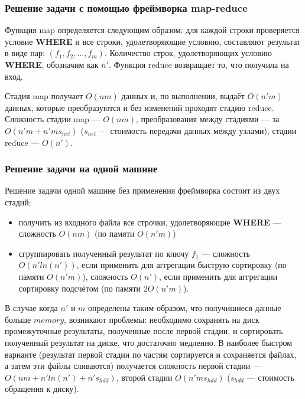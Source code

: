 \documentclass[12pt,a4paper,oneside]{extarticle}
\begin{document}
        \subsubsection{Решение задачи с помощью фреймворка map-reduce}
            
            Функция map определяется следующим образом: для каждой строки проверяется условие {\bf WHERE} и все строки, удолетворяющие условию, составляют результат в виде пар: $(f_1, f_2, ..., f_m)$. Количество строк, удолетворяющих условию {\bf WHERE}, обозначим как $n'$. Функция reduce возвращает то, что получила на вход.

            Стадия map получает $O(nm)$ данных и, по выполнении, выдаёт $O(n'm)$ данных, которые преобразуются и без изменений проходят стадию reduce. Сложность стадии map --- $O(nm)$, преобразования между стадиями --- за $O(n'm+n'ms_{net})$ ($s_{net}$ --- стоимость передачи данных между узлами), стадии reduce --- $O(n')$. 

        \subsubsection{Решение задачи на одной машине}
            Решение задачи одной машине без применения фреймворка состоит из двух стадий: 
            \begin{itemize}
                \item получить из входного файла все строчки, удолетворяющие {\bf WHERE} --- сложность $O(nm)$ (по памяти $O(n'm)$)
                \item сгруппировать полученный результат по ключу $f_1$ --- сложность $O(n'ln(n'))$, если применить для аггрегации быструю сортировку (по памяти $O(n'm)$), сложность $O(n')$, если применить для аггрегации сортировку подсчётом (по памяти $2O(n'm)$).
            \end{itemize}

            В случае когда $n'$ и $m$ определены таким образом, что получишиеся данные больше $memory$, возникают проблемы: необходимо сохранять на диск промежуточные результаты, полученные после первой стадии, и сортировать полученный результат на диске, что достаточно медленно. В наиболее быстром варианте (результат первой стадии по частям сортируется и сохраняется файлах, а затем эти файлы сливаются) получается сложность первой стадии --- $O(nm+n'ln(n')+n's_{hdd})$, второй стадии $O(n'ms_{hdd})$ ($s_{hdd}$ --- стоимость обращения к диску).
\end{document}
